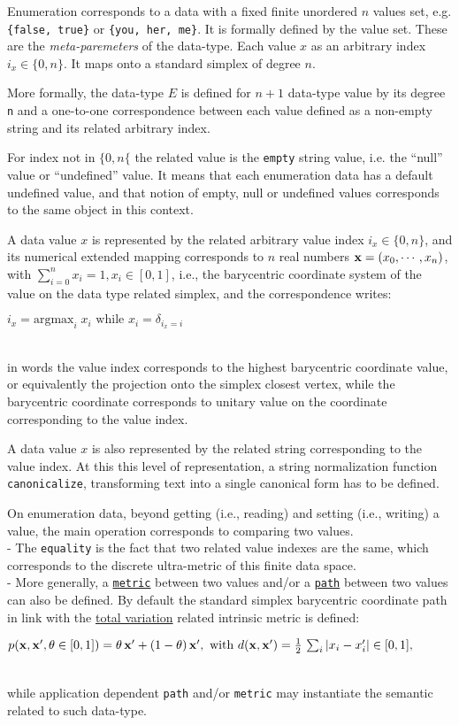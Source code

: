 \documentclass[a4,12pt]{article}
\newcommand{\eqline}[1]{\\\centerline{$#1$}\\}
\begin{document}
Enumeration corresponds to a data with a fixed finite unordered $n$ values set, e.g. {\tt \{false, true\}} or {\tt \{you, her, me\}}. It is formally defined by the value set. These are the {\em meta-paremeters} of the data-type. Each value $x$ as an arbitrary index $i_x \in \{0, n\}$. It maps onto a standard simplex of degree $n$. 

More formally, the data-type $E$ is defined for $n+1$ data-type value by its degree {\tt n} and a one-to-one correspondence between each value defined as a non-empty string and its related arbitrary index. 

For index not in $\{0, n\{$ the related value is the {\tt empty} string value, i.e. the ``null'' value or ``undefined'' value. It means that each enumeration data has a default undefined value, and that notion of empty, null or undefined values corresponds to the same object in this context.

A data value $x$ is represented by the related arbitrary value index $i_x \in \{0, n\}$, and its numerical extended mapping corresponds to $n$ real numbers ${\bf x} = (x_0, \cdots, x_{n})$, with $\sum_{i = 0}^{n} x_i = 1, x_i \in [0, 1]$, i.e., the barycentric coordinate system of the value on the data type related simplex, and the correspondence writes:
\eqline{i_x = \mbox{argmax}_i \; x_i \mbox{ while } x_i = \delta_{i_x = i}}
in words the value index corresponds to the highest barycentric coordinate value, or equivalently the projection onto the simplex closest vertex, while the barycentric coordinate corresponds to unitary value on the coordinate corresponding to the value index.

A data value $x$ is also represented by the related string corresponding to the value index. At this this level of representation, a string normalization function {\tt canonicalize}, transforming text into a single canonical form has to be defined.

On enumeration data, beyond getting (i.e., reading) and setting (i.e., writing) a value, the main operation corresponds to comparing two values.
\\- The {\tt equality} is the fact that two related value indexes are the same, which corresponds to the discrete ultra-metric of this finite data space.
\\- More generally, a \href{https://en.wikipedia.org/wiki/Metric\_(mathematics)}{\tt metric} between two values and/or a \href{https://en.wikipedia.org/wiki/Intrinsic_metric}{\tt path} between two values can also be defined. By default the standard simplex barycentric coordinate path in link with the \href{https://en.wikipedia.org/wiki/Total_variation_distance_of_probability_measures}{total variation} related intrinsic metric is defined:
\eqline{p({\bf x}, {\bf x}', \theta \in [0, 1]) = \theta \, {\bf x}' + (1 - \theta) \, {\bf x}', \mbox{ with } d({\bf x}, {\bf x}') = \frac{1}{2} \, \sum_i |x_i - x'_i| \in [0, 1],}
while application dependent {\tt path} and/or {\tt metric} may instantiate the semantic related to such data-type.
\end{document}
